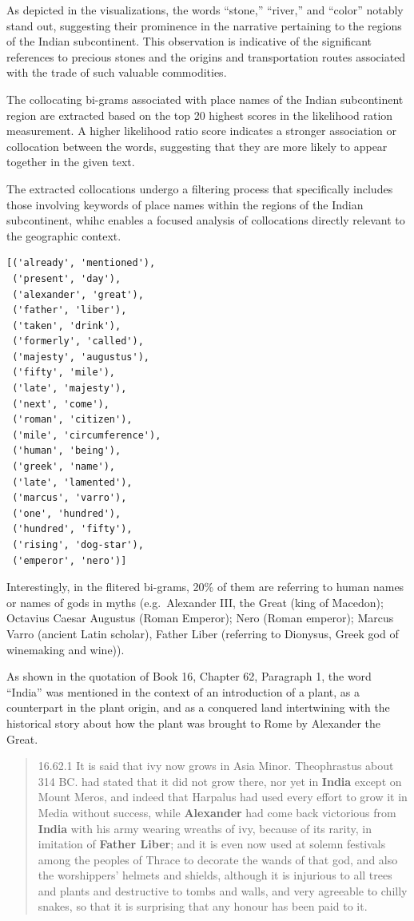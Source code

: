 \documentclass[
  12pt,
]{article}
\begin{document}
As depicted in the visualizations, the words ``stone,'' ``river,'' and
``color'' notably stand out, suggesting their prominence in the
narrative pertaining to the regions of the Indian subcontinent. This
observation is indicative of the significant references to precious
stones and the origins and transportation routes associated with the
trade of such valuable commodities.

The collocating bi-grams associated with place names of the Indian
subcontinent region are extracted based on the top 20 highest scores in
the likelihood ration measurement. A higher likelihood ratio score
indicates a stronger association or collocation between the words,
suggesting that they are more likely to appear together in the given
text.

The extracted collocations undergo a filtering process that specifically
includes those involving keywords of place names within the regions of
the Indian subcontinent, whihc enables a focused analysis of
collocations directly relevant to the geographic context.

\begin{verbatim}
[('already', 'mentioned'),
 ('present', 'day'),
 ('alexander', 'great'),
 ('father', 'liber'),
 ('taken', 'drink'),
 ('formerly', 'called'),
 ('majesty', 'augustus'),
 ('fifty', 'mile'),
 ('late', 'majesty'),
 ('next', 'come'),
 ('roman', 'citizen'),
 ('mile', 'circumference'),
 ('human', 'being'),
 ('greek', 'name'),
 ('late', 'lamented'),
 ('marcus', 'varro'),
 ('one', 'hundred'),
 ('hundred', 'fifty'),
 ('rising', 'dog-star'),
 ('emperor', 'nero')]
\end{verbatim}

Interestingly, in the flitered bi-grams, 20\% of them are referring to
human names or names of gods in myths (e.g.~Alexander III, the Great
(king of Macedon); Octavius Caesar Augustus (Roman Emperor); Nero (Roman
emperor); Marcus Varro (ancient Latin scholar), Father Liber (referring
to Dionysus, Greek god of winemaking and wine)).

As shown in the quotation of Book 16, Chapter 62, Paragraph 1, the word
``India'' was mentioned in the context of an introduction of a plant, as
a counterpart in the plant origin, and as a conquered land intertwining
with the historical story about how the plant was brought to Rome by
Alexander the Great.

\begin{quote}
16.62.1 It is said that ivy now grows in Asia Minor. Theophrastus about
314 BC. had stated that it did not grow there, nor yet in \textbf{India}
except on Mount Meros, and indeed that Harpalus had used every effort to
grow it in Media without success, while \textbf{Alexander} had come back
victorious from \textbf{India} with his army wearing wreaths of ivy,
because of its rarity, in imitation of \textbf{Father Liber}; and it is
even now used at solemn festivals among the peoples of Thrace to
decorate the wands of that god, and also the worshippers' helmets and
shields, although it is injurious to all trees and plants and
destructive to tombs and walls, and very agreeable to chilly snakes, so
that it is surprising that any honour has been paid to it.
\end{quote}
\end{document}
